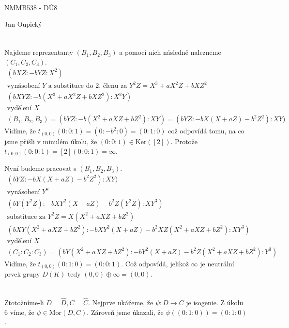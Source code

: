 \documentclass[12pt, a4paper]{article}
\begin{document}
\begin{center}
\large NMMB538 - DÚ8

\normalsize Jan Oupický
\end{center}
\vspace{1\baselineskip}

\section{}
Najdeme reprezentanty $(B_1, B_2, B_3)$ a pomocí nich následně nalezneme $(C_1, C_2, C_3)$.
\begin{gather*}
(bXZ : -bYZ : X^2)\\
\text{vynásobení $Y$ a substituce do 2. členu za $Y^2Z = X^3+aX^2Z+bXZ^2$}\\
(bXYZ : -b(X^3+aX^2Z+bXZ^2) : X^2Y)\\
\text{vydělení $X$}\\
(B_1, B_2, B_3) = (bYZ : -b(X^2+aXZ+bZ^2) : XY) = (bYZ : -bX(X+aZ)-b^2Z^2) : XY)
\end{gather*}
Vidíme, že $t_{(0,0)}(0:0:1) = (0:-b^2 : 0) = (0:1:0)$ což odpovídá tomu, na co jsme přišli v minulém úkolu, že $(0:0:1) \in \text{Ker}([2])$. Protože $t_{(0,0)}(0:0:1) = [2](0:0:1) = \infty$.

Nyní budeme pracovat s $(B_1, B_2, B_3)$.
\begin{gather*}
(bYZ : -bX(X+aZ)-b^2Z^2) : XY)\\
\text{vynásobení $Y^2$}\\
(bY(Y^2Z) : -bXY^2(X+aZ)-b^2Z(Y^2Z) : XY^3)\\
\text{substituce za $Y^2Z = X(X^2+aXZ+bZ^2)$}\\
(bXY(X^2+aXZ+bZ^2) : -bXY^2(X+aZ) - b^2XZ(X^2+aXZ+bZ^2) : XY^3)\\
\text{vydělení $X$}\\
(C_1:C_2:C_3) = (bY(X^2+aXZ+bZ^2) : -bY^2(X+aZ) - b^2Z(X^2+aXZ+bZ^2) : Y^3)
\end{gather*}
Vidíme, že $t_{(0,0)}(0:1:0) = (0:0:1)$. Což odpovídá, jelikož $\infty$ je neutrální prvek grupy $D(K)$ tedy $(0,0) \oplus \infty = (0,0)$.

\section{}

\section{}
Ztotožníme-li $D = \hat{D}, C = \hat{C}$. Nejprve ukážeme, že $\psi: D \rightarrow C$ je isogenie. Z úkolu 6 víme, že $\psi \in \text{Mor}(D, C)$. Zároveň jsme úkazali, že $\psi((0:1:0)) = (0:1:0)$. 
\end{document}
